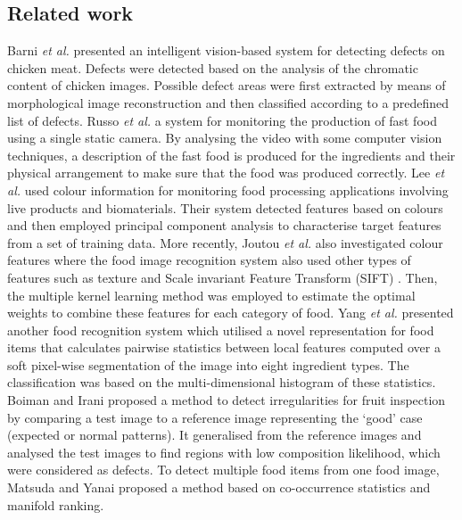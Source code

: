 \documentclass[twocolumn]{svjour3}          %
\begin{document}
\subsection{Related work}
Barni \textit{et al.} \cite{BM97} presented an intelligent vision-based system for detecting defects on chicken meat. Defects were detected based on the analysis of the chromatic content of chicken images. Possible defect areas were first extracted by means of morphological image reconstruction and then classified according to a predefined list of defects. Russo \textit{et al.} \cite{RR02} a system for monitoring the production of fast food using a single static camera. By analysing the video with some computer vision techniques, a description of the fast food is produced for the ingredients and their physical arrangement to make sure that the food was produced correctly. Lee \textit{et al.} \cite{LK07} used colour information for monitoring food processing applications involving live products and biomaterials. Their system detected features based on colours and then employed principal component analysis to characterise target features from a set of training data. More recently, Joutou \textit{et al.} \cite{JT09} also investigated colour features where the food image recognition system also used other types of features such as texture and Scale invariant Feature Transform (SIFT) \cite{LD04}. Then, the multiple kernel learning method was employed to estimate the optimal weights to combine these features for each category of food. Yang \textit{et al.} \cite{YS10} presented another food recognition system which utilised a novel representation for food items that calculates pairwise statistics between local features computed over a soft pixel-wise segmentation of the image into eight ingredient types. The classification was based on the multi-dimensional histogram of these statistics. Boiman and Irani \cite{BO07} proposed a method to detect irregularities for fruit inspection by comparing a test image to a reference image representing the `good' case (expected or normal patterns). It generalised from the reference images and analysed the test images to find regions with low composition likelihood, which were considered as defects. To detect multiple food items from one food image, Matsuda and Yanai \cite{MY12} proposed a method based on co-occurrence statistics and manifold ranking.
\end{document}
